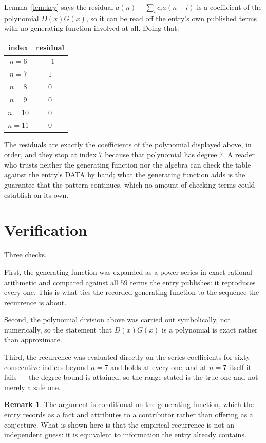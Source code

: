 \documentclass[11pt,a4paper]{article}
\theoremstyle{plain}
\theoremstyle{definition}
\newtheorem{remark}[theorem]{Remark}
\begin{document}
Lemma~\ref{lem:key} says the residual $a(n)-\sum_ic_ia(n-i)$ is a coefficient of the
polynomial $D(x)G(x)$, so it can be read off the entry's own published terms with no
generating function involved at all. Doing that:
\begin{center}
\begin{tabular}{cc}
index & residual \\ \hline
$n=6$ & $-1$ \\
$n=7$ & $1$ \\
$n=8$ & $0$ \\
$n=9$ & $0$ \\
$n=10$ & $0$ \\
$n=11$ & $0$
\end{tabular}
\end{center}
The residuals are exactly the coefficients of the polynomial displayed above, in order, and
they stop at index $7$ because that polynomial has degree $7$. A reader who trusts
neither the generating function nor the algebra can check the table against the entry's DATA
by hand; what the generating function adds is the guarantee that the pattern continues, which
no amount of checking terms could establish on its own.

\section{Verification}

Three checks.

First, the generating function was expanded as a power series in exact rational arithmetic and
compared against all $59$ terms the entry publishes: it reproduces every one. This is
what ties the recorded generating function to the sequence the recurrence is about.

Second, the polynomial division above was carried out symbolically, not numerically, so the
statement that $D(x)G(x)$ is a polynomial is exact rather than approximate.

Third, the recurrence was evaluated directly on the series coefficients for sixty consecutive
indices beyond $n=7$ and holds at every one, and at $n=7$ itself it fails --- the
degree bound is attained, so the range stated is the true one and not merely a safe one.

\begin{remark}
The argument is conditional on the generating function, which the entry records as a fact and
attributes to a contributor rather than offering as a conjecture. What is shown here is that
the empirical recurrence is not an independent guess: it is equivalent to information the
entry already contains.
\end{remark}
\end{document}
